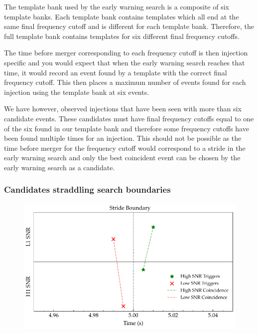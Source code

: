 
The template bank used by the early warning search is a composite of six template banks. Each template bank contains templates which all end at the same final frequency cutoff and is different for each template bank. Therefore, the full template bank contains templates for six different final frequency cutoffs.

The time before merger corresponding to each frequency cutoff is then injection specific and you would expect that when the early warning search reaches that time, it would record an event found by a template with the correct final frequency cutoff. This then places a maximum number of events found for each injection using the template bank at six events.

We have however, observed injections that have been seen with more than six candidate events. These candidates must have final frequency cutoffs equal to one of the six found in our template bank and therefore some frequency cutoffs have been found multiple times for an injection. This should not be possible as the time before merger for the frequency cutoff would correspond to a stride in the early warning search and only the best coincident event can be chosen by the early warning search as a candidate.

\subsubsection{\label{6:sec:cands-across-bounds}Candidates straddling search boundaries}
%
\begin{figure}
       \centering
    \includegraphics[width=\textwidth]{images/6_earlywarning/identified-problems/cands_across_bounds.pdf}
    \caption{}
    \label{6:fig:candidates_across_boundaries}
\end{figure}
%

